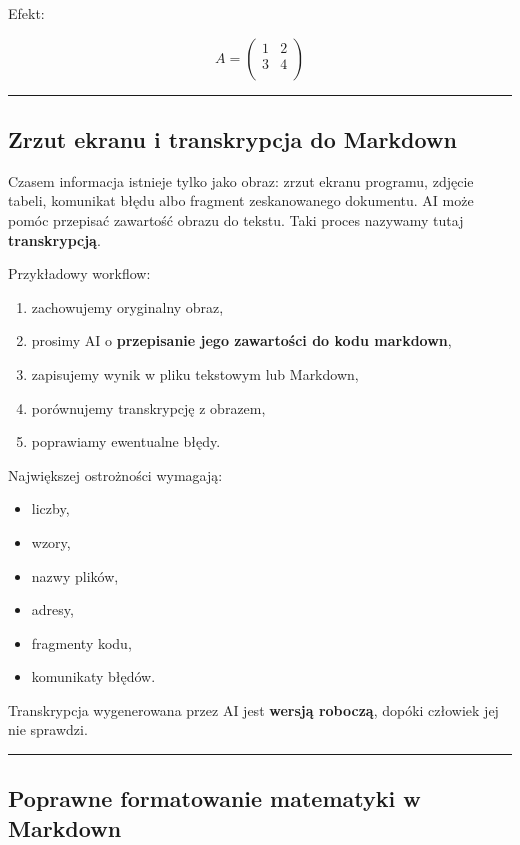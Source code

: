 \documentclass[11pt, a4paper]{article}
\begin{document}
Efekt:

\[
A=
\begin{pmatrix}
1 & 2 \\
3 & 4 \\
\end{pmatrix}
\]

\medskip\hrule\medskip

\subsection{Zrzut ekranu i transkrypcja do Markdown}

Czasem informacja istnieje tylko jako obraz: zrzut ekranu programu, zdjęcie tabeli, komunikat błędu albo fragment zeskanowanego dokumentu. AI może pomóc przepisać zawartość obrazu do tekstu. Taki proces nazywamy tutaj \textbf{transkrypcją}.

Przykładowy workflow:

\begin{enumerate}
    \item zachowujemy oryginalny obraz,
    \item prosimy AI o \textbf{przepisanie jego zawartości do kodu markdown},
    \item zapisujemy wynik w pliku tekstowym lub Markdown,
    \item porównujemy transkrypcję z obrazem,
    \item poprawiamy ewentualne błędy.
\end{enumerate}

Największej ostrożności wymagają:

\begin{itemize}
    \item liczby,
    \item wzory,
    \item nazwy plików,
    \item adresy,
    \item fragmenty kodu,
    \item komunikaty błędów.
\end{itemize}

Transkrypcja wygenerowana przez AI jest \textbf{wersją roboczą}, dopóki człowiek jej nie sprawdzi.

\medskip\hrule\medskip

\subsection{Poprawne formatowanie matematyki w Markdown}
\end{document}
